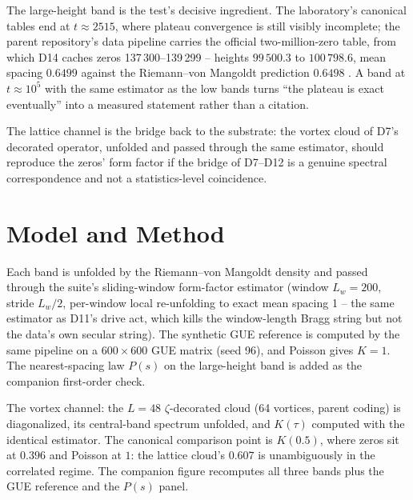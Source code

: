 \documentclass[11pt,a4paper]{article}
\begin{document}
The large-height band is the test's decisive ingredient. The laboratory's canonical tables end at $t \approx 2515$, where plateau convergence is still visibly incomplete; the parent repository's data pipeline carries the official two-million-zero table, from which D14 caches zeros 137\,300--139\,299 -- heights $99\,500.3$ to $100\,798.6$, mean spacing $0.6499$ against the Riemann--von Mangoldt prediction $0.6498$ \cite{zermodd,riemannvm}. A band at $t \approx 10^5$ with the same estimator as the low bands turns ``the plateau is exact eventually'' into a measured statement rather than a citation.

The lattice channel is the bridge back to the substrate: the vortex cloud of D7's decorated operator, unfolded and passed through the same estimator, should reproduce the zeros' form factor if the bridge of D7--D12 is a genuine spectral correspondence and not a statistics-level coincidence.

\section{Model and Method}
Each band is unfolded by the Riemann--von Mangoldt density and passed through the suite's sliding-window form-factor estimator (window $L_w = 200$, stride $L_w/2$, per-window local re-unfolding to exact mean spacing 1 -- the same estimator as D11's drive act, which kills the window-length Bragg string but not the data's own secular string). The synthetic GUE reference is computed by the same pipeline on a $600\times600$ GUE matrix (seed 96), and Poisson gives $K = 1$. The nearest-spacing law $P(s)$ on the large-height band is added as the companion first-order check.

The vortex channel: the $L = 48$ $\zeta$-decorated cloud (64 vortices, parent coding) is diagonalized, its central-band spectrum unfolded, and $K(\tau)$ computed with the identical estimator. The canonical comparison point is $K(0.5)$, where zeros sit at $0.396$ and Poisson at $1$: the lattice cloud's $0.607$ is unambiguously in the correlated regime. The companion figure recomputes all three bands plus the GUE reference and the $P(s)$ panel.
\end{document}
